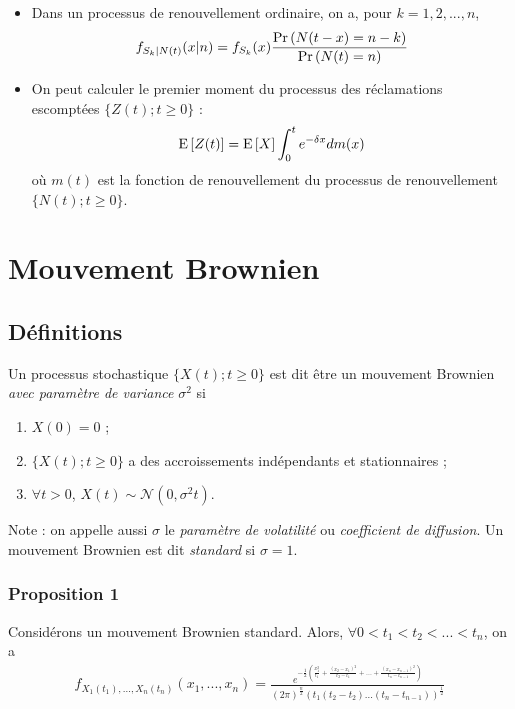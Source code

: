 \documentclass[10pt, french, landscape]{article}
\begin{document}
\begin{multicols*}{3}
\begin{itemize}
\item Dans un processus de renouvellement ordinaire, on a, pour $k = 1, 2, ..., n$,
\begin{align*}
f_{S_k | N(t)}(x | n) = f_{S_k}(x) \frac{\Pr \left( N(t-x) = n-k \right)}{\Pr \left( N(t) = n \right)}
\end{align*}

\item On peut calculer le premier moment du processus des réclamations escomptées $\{ Z(t) ; t \geq 0 \}$ : 
\[\mathrm{E} \left[ Z(t) \right] = \mathrm{E} \left[ X \right] \int_{0}^{t} e^{-\delta x} d m(x) \]
où $m(t)$ est la fonction de renouvellement du processus de renouvellement $\{ N(t) ; t \geq 0 \}$.
\end{itemize}

\section{Mouvement Brownien}
\subsection*{Définitions}
\begin{definition}
Un processus stochastique $\{ X(t) ; t \geq 0 \}$ est dit être un mouvement Brownien \emph{avec paramètre de variance} $\sigma^2$ si
\begin{enumerate}[label=(\arabic*)]
\item $X(0) = 0$ ;
\item $\{ X(t) ; t \geq 0 \}$  a des accroissements indépendants et stationnaires ;
\item $\forall t > 0$, $X(t) \sim \mathcal{N}(0, \sigma^2 t)$.
\end{enumerate}
\end{definition}
Note : on appelle aussi $\sigma$ le \emph{paramètre de volatilité} ou \emph{coefficient de diffusion}. Un mouvement Brownien est dit \emph{standard} si $\sigma = 1$.

\subsubsection*{Proposition 1}
Considérons un mouvement Brownien standard. Alors, $\forall 0 < t_1 < t_2 < ... < t_{n}$, on a
\begin{align*}
f_{X_1(t_1), ..., X_n(t_n)}(x_1, ..., x_n) = \frac{e^{-\frac{1}{2} \left(\frac{x_1^2}{t_1} + \frac{(x_2 - x_1)^2}{t_2 - t_1} + ... + \frac{(x_n - x_{n-1})^2}{t_n - t_{n-1}} \right)}}{(2 \pi)^{\frac{n}{2}} (t_1 (t_2 - t_2) ... (t_n - t_{n-1}))^{\frac{1}{2}}}
\end{align*}


\end{multicols*}
\end{document}

